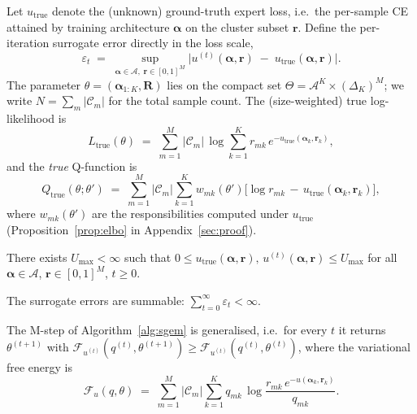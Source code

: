 Let $u_{\mathrm{true}}$ denote the (unknown) ground-truth expert
loss, i.e.\ the per-sample CE attained by training architecture
$\boldsymbol{\alpha}$ on the cluster subset $\mathbf{r}$. Define the
per-iteration surrogate error directly in the loss scale,
\begin{equation}
\label{eq:eps_t}
\varepsilon_t \;=\; \sup_{\boldsymbol{\alpha} \in \mathcal{A}, \;
\mathbf{r} \in [0, 1]^M}
\bigl|u^{(t)}(\boldsymbol{\alpha}, \mathbf{r})
\;-\; u_{\mathrm{true}}(\boldsymbol{\alpha}, \mathbf{r})\bigr|.
\end{equation}
The parameter $\theta = (\boldsymbol{\alpha}_{1:K}, \mathbf{R})$ lies
on the compact set
$\Theta = \mathcal{A}^K \times (\Delta_K)^M$; we write
$N = \sum_m |\mathcal{C}_m|$ for the total sample count. The (size-weighted)
true log-likelihood is
\begin{equation}
\label{eq:Ltrue}
L_{\mathrm{true}}(\theta) \;=\; \sum_{m=1}^M |\mathcal{C}_m|\,\log
\sum_{k=1}^K r_{mk}\, e^{-u_{\mathrm{true}}(\boldsymbol{\alpha}_k, \mathbf{r}_k)},
\end{equation}
and the \emph{true} Q-function is
\begin{equation}
\label{eq:Qtrue}
Q_{\mathrm{true}}(\theta; \theta') \;=\; \sum_{m=1}^M |\mathcal{C}_m|
\sum_{k=1}^K w_{mk}(\theta')
\bigl[\log r_{mk} \,-\, u_{\mathrm{true}}(\boldsymbol{\alpha}_k, \mathbf{r}_k)\bigr],
\end{equation}
where $w_{mk}(\theta')$ are the responsibilities computed under
$u_{\mathrm{true}}$ (Proposition~\ref{prop:elbo} in
Appendix~\ref{sec:proof}).

\begin{assumption}
\label{ass:bounded}
There exists $U_{\max} < \infty$ such that
$0 \leq u_{\mathrm{true}}(\boldsymbol{\alpha}, \mathbf{r}),\,
u^{(t)}(\boldsymbol{\alpha}, \mathbf{r}) \leq U_{\max}$ for all
$\boldsymbol{\alpha}\in\mathcal{A}$, $\mathbf{r}\in[0,1]^M$, $t\geq 0$.
\end{assumption}

\begin{assumption}
\label{ass:summable}
The surrogate errors are summable: $\sum_{t=0}^{\infty} \varepsilon_t < \infty$.
\end{assumption}

\begin{assumption}
\label{ass:gem}
The M-step of Algorithm~\ref{alg:sgem} is generalised, i.e.\ for every
$t$ it returns $\theta^{(t+1)}$ with
$\mathcal{F}_{u^{(t)}}(q^{(t)}, \theta^{(t+1)})
\geq \mathcal{F}_{u^{(t)}}(q^{(t)}, \theta^{(t)})$,
where the variational free energy is
\begin{equation*}
\mathcal{F}_u(q, \theta) \;=\; \sum_{m=1}^M |\mathcal{C}_m|
\sum_{k=1}^K q_{mk}\,\log\!\frac{r_{mk}\, e^{-u(\boldsymbol{\alpha}_k, \mathbf{r}_k)}}{q_{mk}}.
\end{equation*}
\end{assumption}

